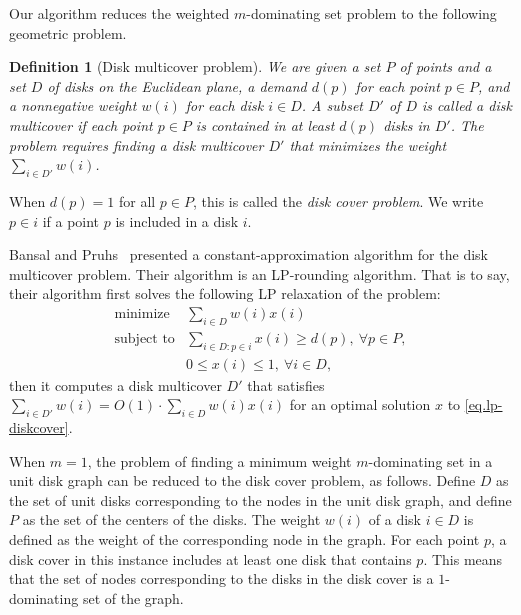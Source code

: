 \documentclass[11pt]{article}
\newtheorem{definition}{Definition}
\begin{document}
Our algorithm reduces the weighted $m$-dominating set problem to the following
geometric problem.

  
 \begin{definition}[Disk multicover problem]
 We are given a set $P$ of points and a set $D$ of disks on the
 Euclidean plane,
  a demand $d(p)$ for each point $p \in P$,
 and a nonnegative weight $w(i)$ for each disk $i \in D$.
  A subset $D'$ of $D$
is called a disk multicover if
 each point $p \in P$ is contained in at least $d(p)$ disks in $D'$.
  The problem requires finding a disk multicover $D'$ that minimizes the weight $\sum_{i \in D'}w(i)$.
  \end{definition}

When $d(p)=1$ for all $p \in P$, this is called the
\emph{disk cover problem}.
We write $p \in i$ if a point $p$ is included in a disk $i$.

Bansal and Pruhs~\cite{Bansal:2012ik} presented a constant-approximation algorithm for the disk
multicover problem.
Their algorithm is an LP-rounding algorithm. That is to say, their
algorithm first solves the following LP relaxation of the problem:
\begin{equation}
 \label{eq.lp-diskcover}
 \begin{array}{ll}
  \text{minimize} & \sum_{i \in D} w(i) x(i)\\
  \text{subject to} & \sum_{i \in D: p \in i} x(i) \geq d(p), \ \forall  p \in P,\\
  &  0 \leq x(i) \leq 1, \  \forall i \in D,
 \end{array}
\end{equation}
then it computes a disk multicover $D'$ 
that satisfies $\sum_{i \in D'}w(i) = O(1) \cdot \sum_{i \in D}
w(i)x(i)$ for an optimal solution $x$ to \eqref{eq.lp-diskcover}.

When $m=1$, the problem of finding a minimum weight $m$-dominating set
in a unit disk graph
can be reduced to the disk cover problem, as follows.
Define $D$ as the set of unit disks corresponding to the nodes in the
unit disk graph, and define $P$ as the set of the centers of the disks.
The weight $w(i)$ of a disk $i \in D$ is defined as the weight of the
corresponding node in the graph.
For each point $p$,
a disk cover in this instance includes at least one disk
that contains $p$. 
This means that the set of nodes corresponding to the disks in the 
disk cover
is a $1$-dominating set of the graph.
\end{document}
